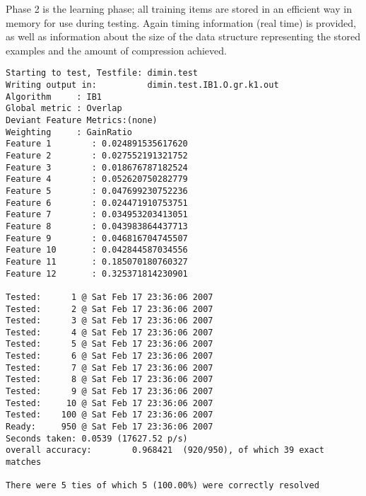 \documentclass{report}
\begin{document}


Phase 2 is the learning phase; all training items are stored in an
efficient way in memory for use during testing. Again timing
information (real time) is provided, as well as information about the
size of the data structure representing the stored examples and the
amount of compression achieved. 



{\footnotesize
\begin{verbatim}
Starting to test, Testfile: dimin.test
Writing output in:          dimin.test.IB1.O.gr.k1.out
Algorithm     : IB1
Global metric : Overlap
Deviant Feature Metrics:(none)
Weighting     : GainRatio
Feature 1        : 0.024891535617620
Feature 2        : 0.027552191321752
Feature 3        : 0.018676787182524
Feature 4        : 0.052620750282779
Feature 5        : 0.047699230752236
Feature 6        : 0.024471910753751
Feature 7        : 0.034953203413051
Feature 8        : 0.043983864437713
Feature 9        : 0.046816704745507
Feature 10       : 0.042844587034556
Feature 11       : 0.185070180760327
Feature 12       : 0.325371814230901

Tested:      1 @ Sat Feb 17 23:36:06 2007
Tested:      2 @ Sat Feb 17 23:36:06 2007
Tested:      3 @ Sat Feb 17 23:36:06 2007
Tested:      4 @ Sat Feb 17 23:36:06 2007
Tested:      5 @ Sat Feb 17 23:36:06 2007
Tested:      6 @ Sat Feb 17 23:36:06 2007
Tested:      7 @ Sat Feb 17 23:36:06 2007
Tested:      8 @ Sat Feb 17 23:36:06 2007
Tested:      9 @ Sat Feb 17 23:36:06 2007
Tested:     10 @ Sat Feb 17 23:36:06 2007
Tested:    100 @ Sat Feb 17 23:36:06 2007
Ready:     950 @ Sat Feb 17 23:36:06 2007
Seconds taken: 0.0539 (17627.52 p/s)
overall accuracy:        0.968421  (920/950), of which 39 exact matches 

There were 5 ties of which 5 (100.00%) were correctly resolved
\end{verbatim}
}


\end{document}
